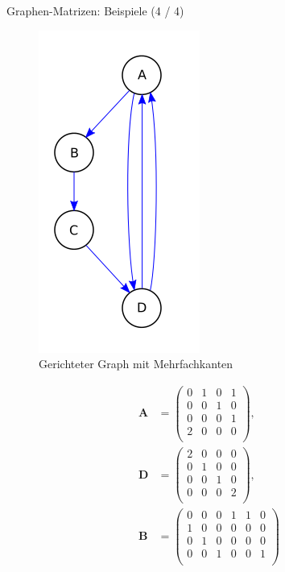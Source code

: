 \documentclass[aspectratio=169]{beamer}
\begin{document}
\begin{frame}{Graphen-Matrizen: Beispiele (4 / 4)}

  \begin{multicols*}{2}
    
    \begin{figure}[H]
      \centering
      \includegraphics[height = 0.6 \textheight]{Graph_gerichtet_Mehrfachkanten.svg.png}
      \caption{Gerichteter Graph mit Mehrfachkanten}
    \end{figure}

    \begin{align*}
      \mathbf A
      & =
      \begin{pmatrix}
        0 & 1 & 0 & 1 \\
        0 & 0 & 1 & 0 \\
        0 & 0 & 0 & 1 \\
        2 & 0 & 0 & 0 \\
      \end{pmatrix}, \\
      \mathbf D
      & =
      \begin{pmatrix}
        2 & 0 & 0 & 0 \\
        0 & 1 & 0 & 0 \\
        0 & 0 & 1 & 0 \\
        0 & 0 & 0 & 2 \\
      \end{pmatrix}, \\
      \mathbf B
      & =
      \begin{pmatrix}
        0 & 0 & 0 & 1 & 1 & 0 \\
        1 & 0 & 0 & 0 & 0 & 0 \\
        0 & 1 & 0 & 0 & 0 & 0 \\
        0 & 0 & 1 & 0 & 0 & 1 \\
      \end{pmatrix}
    \end{align*}

  \end{multicols*}

\end{frame}
\end{document}
